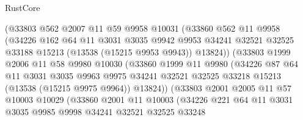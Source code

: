 \begin{lexlean}{RustCore}
\begin{coremodule}
                      (@33803
                        @562
                        @2007
                        @11
                        @59
                        @9958
                        @10031
                        (@33860
                          @562
                          @11
                          @9958
                          (@34226
                            @162
                            @64
                            @11
                            @3031
                            @3035
                            @9942
                            @9953
                            @34241
                            @32521
                            @32525
                            @33188
                            @15213
                            (@13538 (@15215 @9953 @9943))
                            @13824))
                        (@33803
                          @1999
                          @2006
                          @11
                          @58
                          @9980
                          @10030
                          (@33860
                            @1999
                            @11
                            @9980
                            (@34226
                              @87
                              @64
                              @11
                              @3031
                              @3035
                              @9963
                              @9975
                              @34241
                              @32521
                              @32525
                              @33218
                              @15213
                              (@13538 (@15215 @9975 @9964))
                              @13824))
                          (@33803
                            @2001
                            @2005
                            @11
                            @57
                            @10003
                            @10029
                            (@33860
                              @2001
                              @11
                              @10003
                              (@34226
                                @221
                                @64
                                @11
                                @3031
                                @3035
                                @9985
                                @9998
                                @34241
                                @32521
                                @32525
                                @33248

\end{coremodule}
\end{lexlean}
